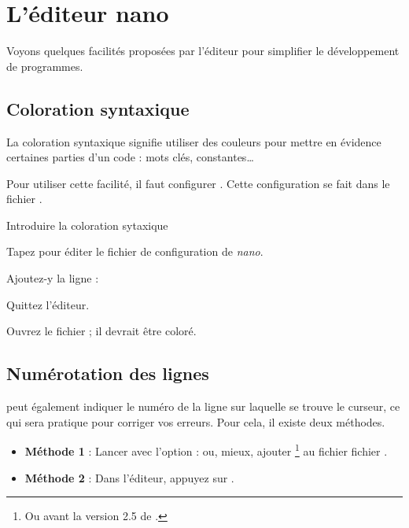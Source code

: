 \documentclass[a4paper,11pt]{style-esi/td}
\begin{document}
\newpage
\section{L'éditeur nano}

	Voyons quelques facilités proposées par l'éditeur 
	pour simplifier le développement de programmes.

	\subsection{Coloration syntaxique}

		La coloration syntaxique signifie 
		utiliser des couleurs pour mettre en évidence certaines parties d'un code :
		mots clés, constantes\ldots
	
		Pour utiliser cette facilité, 
		il faut configurer . 
		Cette configuration se fait dans le fichier .

		\begin{Tutoriel}{Introduire la coloration sytaxique} 
			\vspace{-1em}
			\begin{steps}
			\item 
				Tapez  
				pour éditer le fichier de configuration de \emph{nano}.
			\item 
				Ajoutez-y la ligne : 
			\item 
				Quittez l'éditeur.
			\item 
				Ouvrez le fichier ;
				il devrait être coloré.
			\end{steps}
		\end{Tutoriel}
				
	\subsection{Numérotation des lignes}
				
		 peut également indiquer le numéro de la ligne 
		sur laquelle se trouve 
		le curseur, 
		ce qui sera pratique pour corriger vos erreurs. 
		Pour cela, il existe deux méthodes.

		\begin{itemize}
		\item \textbf{Méthode 1} : 
			Lancer  avec l'option  : 
			ou, mieux, ajouter \footnote{Ou 
			 avant la version 2.5 de .} au fichier
			fichier .
		\item \textbf{Méthode 2} : 
			Dans l'éditeur, appuyez sur .
		\end{itemize}
		
\end{document}
